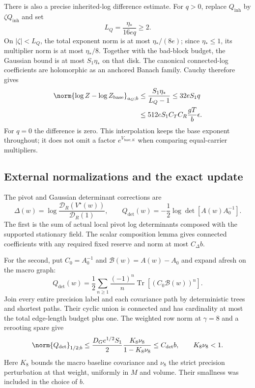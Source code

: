 There is also a precise inherited-log difference estimate.
For $q>0$, replace $Q_{\mathrm{inh}}$ by
$\zeta Q_{\mathrm{inh}}$ and set
\begin{equation}
 L_Q=\frac{\eta_*}{16e q}\ge2.
 \label{cdm-log-interpolation-radius}
\end{equation}
On $|\zeta|<L_Q$, the total exponent norm is at most
$\eta_*/(8e)$; since $\eta_*\le1$, its multiplier norm is
at most $\eta_*/8$. Together with the bad-block budget,
the Gaussian bound is at most $S_1\eta_*$ on that disk.
The canonical connected-log coefficients are holomorphic
as an anchored Banach family. Cauchy therefore gives
\begin{align}
 \norm{\log Z-\log Z_{\mathrm{base}}}_{a_G;b}
 &\le\frac{S_1\eta_*}{L_Q-1}
 \le32eS_1q\notag\\
 &\le512eS_1C_TC_R\frac{gT}{b}\epsilon .
 \label{cdm-log-difference}
\end{align}
For $q=0$ the difference is zero. This interpolation keeps
the base exponent throughout; it does not omit a factor
$e^{V_{\mathrm{base},K}}$ when comparing equal-carrier
multipliers.

\subsection{External normalizations and the exact update}
\label{cdm-update-section}

The pivot and Gaussian determinant corrections are
\begin{equation}
 \Delta(w)=\log\frac{\mathcal D_R(V^\star(w))}
                         {\mathcal D_R(1)},\qquad
 Q_{\det}(w)=-\frac12\log\det[A(w)A_0^{-1}].
 \label{cdm-external-logs}
\end{equation}
The first is the sum of actual local pivot log determinants
composed with the supported stationary field. The scalar
composition lemma gives connected coefficients with any
required fixed reserve and norm at most $C_\Delta b$.

For the second, put $C_0=A_0^{-1}$ and
$\mathcal B(w)=A(w)-A_0$ and expand afresh on the macro graph:
\begin{equation}
 Q_{\det}(w)=\frac12\sum_{n\ge1}\frac{(-1)^n}{n}
                         \operatorname{Tr}[(C_0\mathcal B(w))^n].
 \label{cdm-det-series}
\end{equation}
Join every entire precision label and each covariance path
by deterministic trees and shortest paths. Their cyclic
union is connected and has cardinality at most the total
edge-length budget plus one. The weighted row norm at
$\gamma=8$ and a rerooting spare give
\begin{equation}
 \norm{Q_{\det}}_{1/2;b}
 \le\frac{D_Ge^{1/2}S_1}{2}
       \frac{K_8\nu_8}{1-K_8\nu_8}
 \le C_{\det}b,\qquad K_8\nu_8<1.
 \label{cdm-det-bound}
\end{equation}
Here $K_8$ bounds the macro baseline covariance and $\nu_8$
the strict precision perturbation at that weight, uniformly
in $M$ and volume. Their smallness was included in the
choice of $b$.


